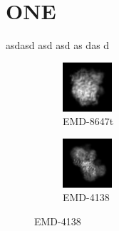 \documentclass{report}
\begin{document}
\chapter{ONE}
asdasd
asd
asd
as
das
d

\begin{figure}[H]
\centering
\begin{subfigure}{1\textwidth}
\centering
\includegraphics[width=0.2\textwidth]{Emd_8647_proj1.jpg}
\captionsetup{justification=centering}
\caption{EMD-8647t}
\end{subfigure} 
\begin{subfigure}{1\textwidth}
\centering
\includegraphics[width=0.2\textwidth]{Emd_4138_proj_1.jpg}
\captionsetup{justification=centering}
\caption{EMD-4138}
\end{subfigure}
\label{fig:emd_projection}
\end{figure}
\end{document}

